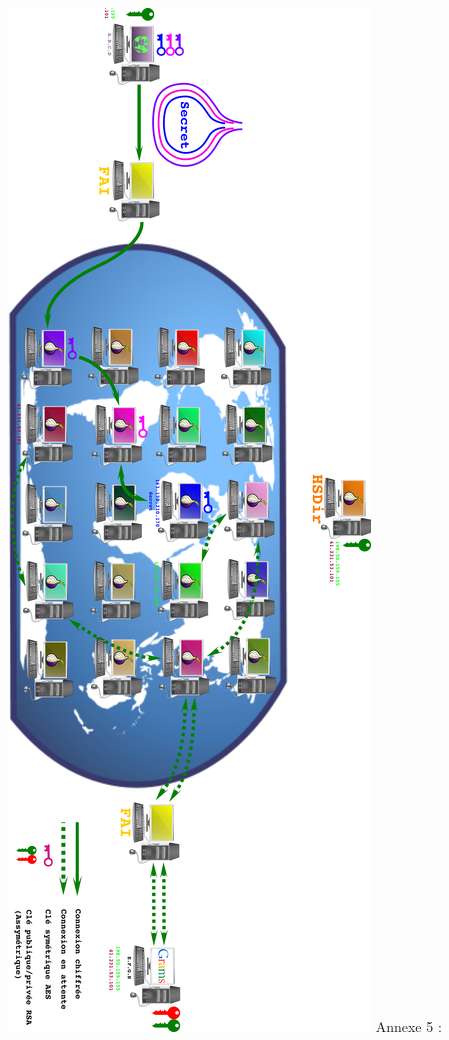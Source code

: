 \documentclass[]{article}
\begin{document}
\includegraphics{images/Connexion_RDV.png} Annexe 5 :
\end{document}

